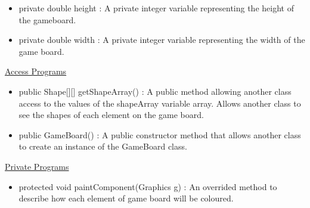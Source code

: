 \documentclass[12pt]{article}
\begin{document}
\begin{itemize}
\begin{itemize}
			\item private double height : A private integer variable representing the height of the gameboard.
			\item private double width : A private integer variable representing the width of the game board.
		\end{itemize}
		\underline{Access Programs}
		\begin{itemize}
			\item public Shape[][] getShapeArray() : A public method allowing another class access to the values of the shapeArray variable array. Allows another class to see the shapes of each element on the game board.
			\item public GameBoard() : A public constructor method that allows another class to create an instance of the GameBoard class.
			
		\end{itemize}
		\underline{Private Programs}
		\begin{itemize}
			\item protected void paintComponent(Graphics g) : An overrided method to describe how each element of game board will be coloured. 
	
		\end{itemize}
		

\end{itemize}
\end{document}
